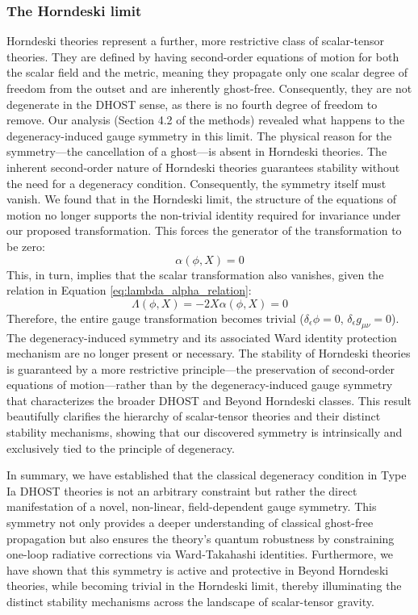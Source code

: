 \documentclass[twocolumn]{aastex631}
\begin{document}
\subsubsection{The Horndeski limit}
Horndeski theories represent a further, more restrictive class of scalar-tensor theories. They are defined by having second-order equations of motion for both the scalar field and the metric, meaning they propagate only one scalar degree of freedom from the outset and are inherently ghost-free. Consequently, they are not degenerate in the DHOST sense, as there is no fourth degree of freedom to remove.
Our analysis (Section 4.2 of the methods) revealed what happens to the degeneracy-induced gauge symmetry in this limit. The physical reason for the symmetry—the cancellation of a ghost—is absent in Horndeski theories. The inherent second-order nature of Horndeski theories guarantees stability without the need for a degeneracy condition. Consequently, the symmetry itself must vanish. We found that in the Horndeski limit, the structure of the equations of motion no longer supports the non-trivial identity required for invariance under our proposed transformation. This forces the generator of the transformation to be zero:
\begin{equation} \label{eq:alpha_horndeski}
    \alpha(\phi, X) = 0
\end{equation}
This, in turn, implies that the scalar transformation also vanishes, given the relation in Equation \ref{eq:lambda_alpha_relation}:
\begin{equation} \label{eq:lambda_horndeski}
    \Lambda(\phi, X) = -2X\alpha(\phi, X) = 0
\end{equation}
Therefore, the entire gauge transformation becomes trivial ($\delta_\epsilon \phi = 0$, $\delta_\epsilon g_{\mu\nu} = 0$). The degeneracy-induced symmetry and its associated Ward identity protection mechanism are no longer present or necessary. The stability of Horndeski theories is guaranteed by a more restrictive principle—the preservation of second-order equations of motion—rather than by the degeneracy-induced gauge symmetry that characterizes the broader DHOST and Beyond Horndeski classes. This result beautifully clarifies the hierarchy of scalar-tensor theories and their distinct stability mechanisms, showing that our discovered symmetry is intrinsically and exclusively tied to the principle of degeneracy.

In summary, we have established that the classical degeneracy condition in Type Ia DHOST theories is not an arbitrary constraint but rather the direct manifestation of a novel, non-linear, field-dependent gauge symmetry. This symmetry not only provides a deeper understanding of classical ghost-free propagation but also ensures the theory's quantum robustness by constraining one-loop radiative corrections via Ward-Takahashi identities. Furthermore, we have shown that this symmetry is active and protective in Beyond Horndeski theories, while becoming trivial in the Horndeski limit, thereby illuminating the distinct stability mechanisms across the landscape of scalar-tensor gravity.
\end{document}
